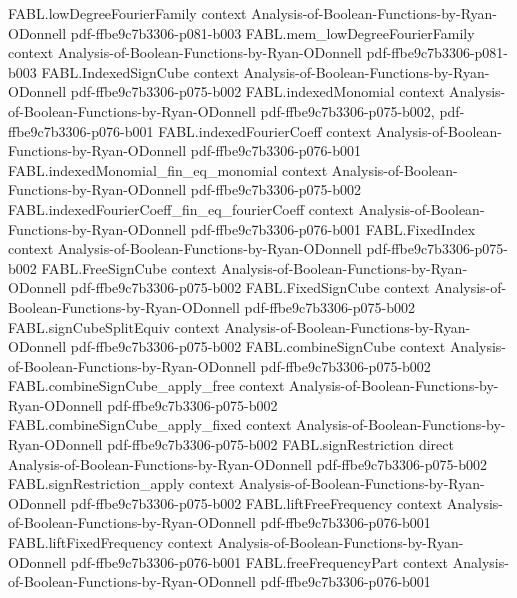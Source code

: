 \begin{theorem}
\proofstep
  {FABL.lowDegreeFourierFamily}
  {context}
  {Analysis-of-Boolean-Functions-by-Ryan-ODonnell}
  {pdf-ffbe9c7b3306-p081-b003}
\proofstep
  {FABL.mem_lowDegreeFourierFamily}
  {context}
  {Analysis-of-Boolean-Functions-by-Ryan-ODonnell}
  {pdf-ffbe9c7b3306-p081-b003}
\proofstep
  {FABL.IndexedSignCube}
  {context}
  {Analysis-of-Boolean-Functions-by-Ryan-ODonnell}
  {pdf-ffbe9c7b3306-p075-b002}
\proofstep
  {FABL.indexedMonomial}
  {context}
  {Analysis-of-Boolean-Functions-by-Ryan-ODonnell}
  {pdf-ffbe9c7b3306-p075-b002,
    pdf-ffbe9c7b3306-p076-b001}
\proofstep
  {FABL.indexedFourierCoeff}
  {context}
  {Analysis-of-Boolean-Functions-by-Ryan-ODonnell}
  {pdf-ffbe9c7b3306-p076-b001}
\proofstep
  {FABL.indexedMonomial_fin_eq_monomial}
  {context}
  {Analysis-of-Boolean-Functions-by-Ryan-ODonnell}
  {pdf-ffbe9c7b3306-p075-b002}
\proofstep
  {FABL.indexedFourierCoeff_fin_eq_fourierCoeff}
  {context}
  {Analysis-of-Boolean-Functions-by-Ryan-ODonnell}
  {pdf-ffbe9c7b3306-p076-b001}
\proofstep
  {FABL.FixedIndex}
  {context}
  {Analysis-of-Boolean-Functions-by-Ryan-ODonnell}
  {pdf-ffbe9c7b3306-p075-b002}
\proofstep
  {FABL.FreeSignCube}
  {context}
  {Analysis-of-Boolean-Functions-by-Ryan-ODonnell}
  {pdf-ffbe9c7b3306-p075-b002}
\proofstep
  {FABL.FixedSignCube}
  {context}
  {Analysis-of-Boolean-Functions-by-Ryan-ODonnell}
  {pdf-ffbe9c7b3306-p075-b002}
\proofstep
  {FABL.signCubeSplitEquiv}
  {context}
  {Analysis-of-Boolean-Functions-by-Ryan-ODonnell}
  {pdf-ffbe9c7b3306-p075-b002}
\proofstep
  {FABL.combineSignCube}
  {context}
  {Analysis-of-Boolean-Functions-by-Ryan-ODonnell}
  {pdf-ffbe9c7b3306-p075-b002}
\proofstep
  {FABL.combineSignCube_apply_free}
  {context}
  {Analysis-of-Boolean-Functions-by-Ryan-ODonnell}
  {pdf-ffbe9c7b3306-p075-b002}
\proofstep
  {FABL.combineSignCube_apply_fixed}
  {context}
  {Analysis-of-Boolean-Functions-by-Ryan-ODonnell}
  {pdf-ffbe9c7b3306-p075-b002}
\proofstep
  {FABL.signRestriction}
  {direct}
  {Analysis-of-Boolean-Functions-by-Ryan-ODonnell}
  {pdf-ffbe9c7b3306-p075-b002}
\proofstep
  {FABL.signRestriction_apply}
  {context}
  {Analysis-of-Boolean-Functions-by-Ryan-ODonnell}
  {pdf-ffbe9c7b3306-p075-b002}
\proofstep
  {FABL.liftFreeFrequency}
  {context}
  {Analysis-of-Boolean-Functions-by-Ryan-ODonnell}
  {pdf-ffbe9c7b3306-p076-b001}
\proofstep
  {FABL.liftFixedFrequency}
  {context}
  {Analysis-of-Boolean-Functions-by-Ryan-ODonnell}
  {pdf-ffbe9c7b3306-p076-b001}
\proofstep
  {FABL.freeFrequencyPart}
  {context}
  {Analysis-of-Boolean-Functions-by-Ryan-ODonnell}
  {pdf-ffbe9c7b3306-p076-b001}
\proofstep

\end{theorem}
